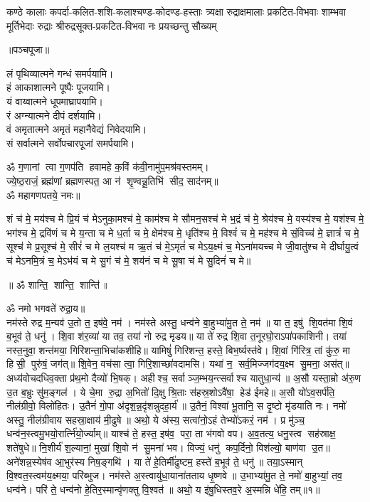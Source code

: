 {कण्ठे कालाः कपर्दा-कलित-शशि-कलाश्चण्ड-कोदण्ड-हस्ताः}
{त्र्यक्षा रुद्राक्षमालाः प्रकटित-विभवाः शाम्भवा मूर्तिभेदाः}
{रुद्राः श्रीरुद्रसूक्त-प्रकटित-विभवा नः प्रयच्छन्तु सौख्यम्}

\centerline{॥पञ्चपूजा॥}

लं पृथिव्यात्मने गन्धं समर्पयामि।\\
हं आकाशात्मने पूष्पैः पूजयामि।\\
यं वाय्वात्मने धूपमाघ्रापयामि।\\
रं अग्न्यात्मने दीपं दर्शयामि।\\
वं अमृतात्मने अमृतं महानैवेद्यं निवेदयामि।\\
सं सर्वात्मने सर्वोपचारपूजां समर्पयामि।

ॐ ग॒णानां त्वा ग॒णप॑ति हवामहे क॒विं क॑वी॒नामु॑प॒मश्र॑वस्तमम्। \\
ज्ये॒ष्ठ॒राजं॒ ब्रह्म॑णां ब्रह्मणस्पत॒ आ न॑ शृ॒ण्वन्नू॒तिभि॑ सीद॒ साद॑नम्॥ \\
ॐ महागणपतये॒ नमः॥ 


शं च॑ मे॒ मय॑श्च मे प्रि॒यं च॑ मेऽनुका॒मश्च॑ मे॒ काम॑श्च मे सौमन॒सश्च॑ मे भ॒द्रं च॑ मे॒ श्रेय॑श्च मे॒ वस्य॑श्च मे॒ यश॑श्च मे॒ भग॑श्च मे॒ द्रवि॑णं च मे य॒न्ता च मे ध॒र्ता च मे॒ क्षेम॑श्च मे॒ धृति॑श्च मे॒ विश्वं॑ च मे॒ मह॑श्च मे सं॒विच्च॑ मे॒ ज्ञात्रं॑ च मे॒ सूश्च॑ मे प्र॒सूश्च॑ मे॒ सीरं॑ च मे ल॒यश्च॑ म ऋ॒तं च॑ मे॒ऽमृतं॑ च मेऽय॒क्ष्मं च॒ मेऽना॑मयच्च मे जी॒वातु॑श्च मे दीर्घायु॒त्वं च॑ मेऽनमि॒त्रं च॒ मेऽभ॑यं च मे सु॒गं च॑ मे॒ शय॑नं च मे सू॒षा च॑ मे सु॒दिनं॑ च मे॥
\centerline{॥ ॐ शान्ति॒ शान्ति॒ शान्ति॑॥}

{\small \closesection}



ॐ नमो भगवते॑ रुद्रा॒य॥\\
 नम॑स्ते रुद्र म॒न्यव॑ उ॒तो त॒ इष॑वे॒ नम॑। नम॑स्ते अस्तु॒ धन्व॑ने बा॒हुभ्या॑मु॒त ते॒ नम॑॥ या त॒ इषु॑ शि॒वत॑मा शि॒वं ब॒भूव॑ ते॒ धनु॑। शि॒वा श॑र॒व्या॑ या तव॒ तया॑ नो रुद्र मृडय॥ या ते॑ रुद्र शि॒वा त॒नूरघो॒राऽपा॑पकाशिनी। तया॑ नस्त॒नुवा॒ शन्त॑मया॒ गिरि॑शन्ता॒\-भिचा॑कशीहि॥ यामिषुं॑ गिरिशन्त॒ हस्ते॒ बिभ॒र्ष्यस्त॑वे। शि॒वां गि॑रित्र॒ तां कु॑रु॒ मा हिसी॒ पुरु॑षं॒ जग॑त्॥ शि॒वेन॒ वच॑सा त्वा॒ गिरि॒शाच्छा॑वदामसि। यथा॑ न॒ सर्व॒मिज्जग॑दय॒क्ष्म सु॒मना॒ अस॑त्॥ अध्य॑वोचदधिव॒क्ता प्र॑थ॒मो दैव्यो॑ भि॒षक्।  अहीश्च॒ सर्वाञ्ज॒म्भय॒न्त्सर्वाश्च यातुधा॒न्य॑॥ अ॒सौ यस्ता॒म्रो अ॑रु॒ण उ॒त ब॒भ्रुः सु॑म॒ङ्गल॑। ये चे॒मा रु॒द्रा अ॒भितो॑ दि॒क्षु श्रि॒ताः स॑हस्र॒शोऽवै॑षा॒ हेड॑ ईमहे॥ अ॒सौ यो॑ऽव॒सर्प॑ति॒ नील॑ग्रीवो॒ विलो॑हितः। उ॒तैनं॑ गो॒पा अ॑दृश॒न्न॒दृ॑शन्नुदहा॒र्य॑॥ उ॒तैनं॒ विश्वा॑ भू॒तानि॒ स दृ॒ष्टो मृ॑डयाति नः। नमो॑ अस्तु॒ नील॑ग्रीवाय सहस्रा॒क्षाय॑ मी॒ढुषे॥ अथो॒ ये अ॑स्य॒ सत्वा॑नो॒ऽहं तेभ्यो॑ऽकरं॒ नम॑। प्र मु॑ञ्च॒ धन्व॑न॒स्त्वमु॒भयो॒रार्त्नि॑यो॒र्ज्याम्॥ याश्च॑ ते॒ हस्त॒ इष॑व॒ परा॒ ता भ॑गवो वप। अ॒व॒तत्य॒ धनु॒स्त्व सह॑स्राक्ष॒ शते॑षुधे॥ नि॒शीर्य॑ श॒ल्यानां॒ मुखा॑ शि॒वो न॑ सु॒मना॑ भव। विज्यं॒ धनु॑ कप॒र्दिनो॒ विश॑ल्यो॒ बाण॑वा उ॒त॥
 अने॑शन्न॒\-स्येष॑व आ॒भुर॑स्य निष॒ङ्गथि॑। या ते॑ हे॒तिर्मी॑ढुष्टम॒ हस्ते॑ ब॒भूव॑ ते॒ धनु॑॥ तया॒ऽस्मान् वि॒श्वत॒स्त्वम॑य॒क्ष्मया॒ परि॑ब्भुज। नम॑स्ते अ॒स्त्वायु॑धा॒याना॑तताय धृ॒ष्णवे॥ उ॒भाभ्या॑मु॒त ते॒ नमो॑ बा॒हुभ्यां॒ तव॒ धन्व॑ने। परि॑ ते॒ धन्व॑नो हे॒तिर॒स्मान्वृ॑णक्तु वि॒श्वत॑॥ अथो॒ य इ॑षु॒धिस्तव॒\aav{}\aav{}रे अ॒स्मन्नि धे॑हि॒ तम्॥१॥


